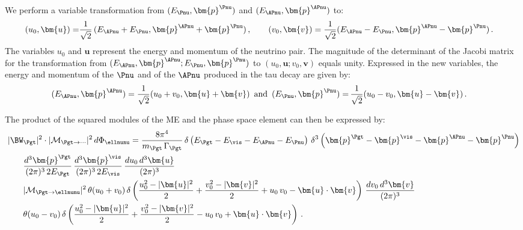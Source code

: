 We perform a variable transformation from $(E_{\Pnu}, \bm{p}^{\Pnu})$
and $(E_{\APnu}, \bm{p}^{\APnu})$ to:
\begin{align}
(u_{0}, \bm{u}) = & \frac{1}{\sqrt{2}} \, (E_{\APnu} + E_{\Pnu}, \bm{p}^{\APnu} +
\bm{p}^{\Pnu}) \, , \qquad (v_{0}, \bm{v}) = \frac{1}{\sqrt{2}} (
  E_{\APnu} - E_{\Pnu}, \bm{p}^{\APnu} - \bm{p}^{\Pnu} ) \, . \nonumber 
\end{align}
The variables $u_{0}$ and $\bm{u}$ represent the energy and momentum of the neutrino pair.
The magnitude of the determinant of the Jacobi matrix for the transformation from
$(E_{\APnu}, \bm{p}^{\APnu}; E_{\Pnu}, \bm{p}^{\Pnu})$
to $(u_{0}, \bm{u}; v_{0}, \bm{v})$ equals unity.
Expressed in the new variables, the energy and momentum of the
$\Pnu$ and of the $\APnu$ produced in the tau decay are given by:
\begin{align}
( E_{\APnu}, \bm{p}^{\APnu} ) = \frac{1}{\sqrt{2}} (
u_{0} + v_{0}, \bm{u} + \bm{v} ) \, \mbox{ and } \,
( E_{\Pnu}, \bm{p}^{\Pnu} ) = & \, \frac{1}{\sqrt{2}} ( u_{0} - v_{0}, \bm{u}
- \bm{v} ) \, . \nonumber 
\end{align}

The product of the squared modules of the ME and the phase space
element can then be expressed by:
\begin{align}
& \, \vert \BW_{\Pgt} \vert^{2} \cdot \vert\mathcal{M}_{\Pgt\to\cdots}\vert^{2} \,
 d\Phi_{\ellnunu} = \frac{8\pi^{4}}{m_{\Pgt} \, \Gamma_{\Pgt}} \,
 \delta \left( E_{\Pgt} - E_{\vis} - E_{\APnu} -
  E_{\Pnu} \right) \, \delta^{3} \left( \bm{p}^{\Pgt} -
  \bm{p}^{\vis} - \bm{p}^{\APnu} - \bm{p}^{\Pnu} \right) \nonumber \\
 & \qquad
\frac{d^{3}\bm{p}^{\Pgt}}{(2\pi)^{3} \, 2 E_{\Pgt}} \,
\frac{d^{3}\bm{p}^{\vis}}{(2\pi)^{3} \, 2 E_{\vis}} \,
\frac{du_{0} \, d^{3}\bm{u}}{(2\pi)^{3}} \nonumber \\
 & \qquad
  \vert\mathcal{M}_{\Pgt \to
  \ellnunu}\vert^{2} \, \theta(u_{0} + v_{0}) \, \delta
\left( \frac{u_{0}^{2} - \vert\bm{u}\vert^{2}}{2} + \frac{v_{0}^{2} - \vert\bm{v}\vert^{2}}{2} +
  u_{0} \, v_{0} - \bm{u} \cdot \bm{v} \right) \, 
  \frac{dv_{0} \, d^{3}\bm{v}}{(2\pi)^{3}} \nonumber \\
 & \qquad
  \theta(u_{0}
  - v_{0}) \, \delta \left( \frac{u_{0}^{2} - \vert\bm{u}\vert^{2}}{2} +
    \frac{v_{0}^{2} - \vert\bm{v}\vert^{2}}{2} - u_{0} \, v_{0} + \bm{u}
    \cdot \bm{v} \right) \, .
\label{eq:lepTauDecaysPSint}
\end{align}

